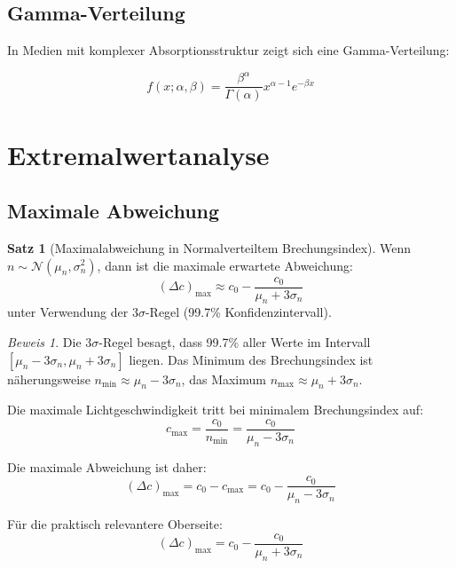 \documentclass[12pt,a4paper,oneside]{article}
\theoremstyle{definition}
\newtheorem{satz}{Satz}[section]
\theoremstyle{remark}
\newtheorem*{beweis}{Beweis}
\newcommand{\cLight}{c}
\newcommand{\refIndex}{n}
\newcommand{\deviation}{\Delta}
\begin{document}
\subsection{Gamma-Verteilung}

In Medien mit komplexer Absorptionsstruktur zeigt sich eine Gamma-Verteilung:

\begin{equation}
    f(x; \alpha, \beta) = \frac{\beta^\alpha}{\Gamma(\alpha)} x^{\alpha-1} e^{-\beta x}
\end{equation}

\section{Extremalwertanalyse}

\subsection{Maximale Abweichung}

\begin{satz}[Maximalabweichung in Normalverteiltem Brechungsindex]
Wenn $\refIndex \sim \mathcal{N}(\mu_n, \sigma_n^2)$, dann ist die maximale erwartete Abweichung:
\begin{equation}
    (\deviation \cLight)_{\max} \approx \cLight_0 - \frac{\cLight_0}{\mu_n + 3\sigma_n}
\end{equation}
unter Verwendung der $3\sigma$-Regel (99.7\% Konfidenzintervall).
\end{satz}

\begin{beweis}
Die $3\sigma$-Regel besagt, dass 99.7\% aller Werte im Intervall $[\mu_n - 3\sigma_n, \mu_n + 3\sigma_n]$ liegen. Das Minimum des Brechungsindex ist näherungsweise $n_{\min} \approx \mu_n - 3\sigma_n$, das Maximum $n_{\max} \approx \mu_n + 3\sigma_n$.

Die maximale Lichtgeschwindigkeit tritt bei minimalem Brechungsindex auf:
\begin{equation}
    \cLight_{\max} = \frac{\cLight_0}{n_{\min}} = \frac{\cLight_0}{\mu_n - 3\sigma_n}
\end{equation}

Die maximale Abweichung ist daher:
\begin{equation}
    (\deviation \cLight)_{\max} = \cLight_0 - \cLight_{\max} = \cLight_0 - \frac{\cLight_0}{\mu_n - 3\sigma_n}
\end{equation}

Für die praktisch relevantere Oberseite:
\begin{equation}
    (\deviation \cLight)_{\max} = \cLight_0 - \frac{\cLight_0}{\mu_n + 3\sigma_n}
\end{equation}
\end{beweis}
\end{document}
